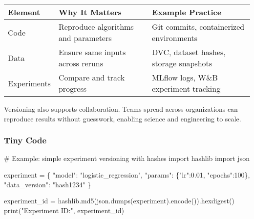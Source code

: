 \documentclass[
  letterpaper,
  DIV=11,
  numbers=noendperiod]{scrreprt}
\newenvironment{Shaded}{\begin{snugshade}}{\end{snugshade}}
\newcommand{\BuiltInTok}[1]{\textcolor[rgb]{0.00,0.23,0.31}{#1}}
\newcommand{\CommentTok}[1]{\textcolor[rgb]{0.37,0.37,0.37}{#1}}
\newcommand{\DecValTok}[1]{\textcolor[rgb]{0.68,0.00,0.00}{#1}}
\newcommand{\FloatTok}[1]{\textcolor[rgb]{0.68,0.00,0.00}{#1}}
\newcommand{\ImportTok}[1]{\textcolor[rgb]{0.00,0.46,0.62}{#1}}
\newcommand{\NormalTok}[1]{\textcolor[rgb]{0.00,0.23,0.31}{#1}}
\newcommand{\OperatorTok}[1]{\textcolor[rgb]{0.37,0.37,0.37}{#1}}
\newcommand{\StringTok}[1]{\textcolor[rgb]{0.13,0.47,0.30}{#1}}
\begin{document}
\begin{longtable}[]{@{}
  >{\raggedright\arraybackslash}p{}
  >{\raggedright\arraybackslash}p{}
  >{\raggedright\arraybackslash}p{}@{}}
\toprule\noalign{}
\begin{minipage}[b]{\linewidth}\raggedright
Element
\end{minipage} & \begin{minipage}[b]{\linewidth}\raggedright
Why It Matters
\end{minipage} & \begin{minipage}[b]{\linewidth}\raggedright
Example Practice
\end{minipage} \\
\midrule\noalign{}
\endhead
\bottomrule\noalign{}
\endlastfoot
Code & Reproduce algorithms and parameters & Git commits, containerized
environments \\
Data & Ensure same inputs across reruns & DVC, dataset hashes, storage
snapshots \\
Experiments & Compare and track progress & MLflow logs, W\&B experiment
tracking \\
\end{longtable}

Versioning also supports collaboration. Teams spread across
organizations can reproduce results without guesswork, enabling science
and engineering to scale.

\subsubsection{Tiny Code}\label{tiny-code-91}

\begin{Shaded}
\begin{Highlighting}[]
\CommentTok{\# Example: simple experiment versioning with hashes}
\ImportTok{import}\NormalTok{ hashlib}
\ImportTok{import}\NormalTok{ json}

\NormalTok{experiment }\OperatorTok{=}\NormalTok{ \{}
    \StringTok{"model"}\NormalTok{: }\StringTok{"logistic\_regression"}\NormalTok{,}
    \StringTok{"params"}\NormalTok{: \{}\StringTok{"lr"}\NormalTok{:}\FloatTok{0.01}\NormalTok{, }\StringTok{"epochs"}\NormalTok{:}\DecValTok{100}\NormalTok{\},}
    \StringTok{"data\_version"}\NormalTok{: }\StringTok{"hash1234"}
\NormalTok{\}}

\NormalTok{experiment\_id }\OperatorTok{=}\NormalTok{ hashlib.md5(json.dumps(experiment).encode()).hexdigest()}
\BuiltInTok{print}\NormalTok{(}\StringTok{"Experiment ID:"}\NormalTok{, experiment\_id)}
\end{Highlighting}
\end{Shaded}
\end{document}
